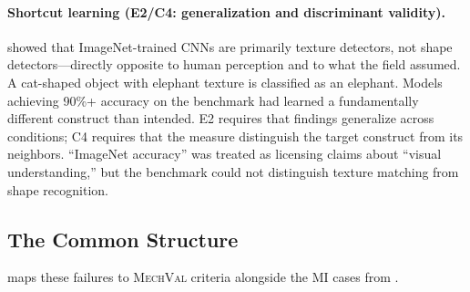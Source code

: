 \documentclass[10pt]{article}
\newcommand{\mechval}{\textsc{MechVal}}
\begin{document}
\paragraph{Shortcut learning (E2/C4: generalization and discriminant validity).}
\citet{geirhos2019imagenet} showed that ImageNet-trained CNNs are primarily texture detectors, not shape detectors---directly opposite to human perception and to what the field assumed. A cat-shaped object with elephant texture is classified as an elephant. Models achieving 90\%+ accuracy on the benchmark had learned a fundamentally different construct than intended. E2 requires that findings generalize across conditions; C4 requires that the measure distinguish the target construct from its neighbors. ``ImageNet accuracy'' was treated as licensing claims about ``visual understanding,'' but the benchmark could not distinguish texture matching from shape recognition.

\subsection{The Common Structure}

 maps these failures to \mechval{} criteria alongside the MI cases from .
\end{document}
